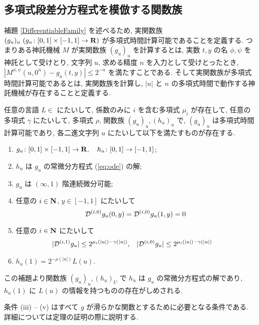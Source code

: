 \subsection{多項式段差分方程式を模倣する関数族}

 補題 \ref{DifferentiableFamily} を述べるため, 
 実関数族 $(g_u)_u \ (g_u \colon [0,1] \times [-1, 1] \to \mathbf R)$ 
 が多項式時間計算可能であることを定義する.
 つまりある神託機械 $M$ が実関数族 $(g_u)_u$ を計算するとは,
 実数 $t,y$ の名 $\phi, \psi$ を神託として受けとり,
 文字列 $u$, 求める精度 $n$ を入力として受けとったとき,
 $|M^{\phi, \psi}(u, 0^n) - g_u(t, y)| \le 2^{-n}$ を満たすことである.
 そして実関数族が多項式時間計算可能であるとは,
 実関数族を計算し, $|u|$ と $n$ の多項式時間で動作する神託機械が存在することと定義する.


\begin{lemma}
 \label{DifferentiableFamily}
 任意の言語 $L \in $ \PSPACE にたいして, 
 係数のみに $i$ を含む多項式 $\mu_i$ が存在して,
 任意の多項式 $\gamma$ にたいして,
 多項式 $\rho$, 関数族 $(g_u)_u, (h_u)_u$ で, 
 $(g_u)_u$ は多項式時間計算可能であり,
 各二進文字列 $u$ にたいして以下を満たすものが存在する.
 \begin{enumerate}
  \item $g_u\colon [0,1] \times [-1,1]\to \mathbf R, \quad h_u\colon [0,1] \to [-1,1]$;
  \item $h_u$ は $g_u$ の常微分方程式 (\ref{eq:ode}) の解; 
  \item $g_u$ は $(\infty, 1)$ 階連続微分可能;
  \item 任意の $i \in \mathbf N$, $y \in [-1,1]$ にたいして
	\begin{equation*}
	 \mathcal D^{(i, 0)} g_u(0,y) = \mathcal D^{(i, 0)} g_u(1,y) = 0 
	\end{equation*}
  \item 任意の $i \in \mathbf N$ にたいして
	\begin{align*}
	 |\mathcal D^{(i,1)} g_u| &\leq 2^{\mu_i (|u|) - \gamma(|u|)}, &
	 |\mathcal D^{(i,0)} g_u| &\leq 2^{\mu_i (|u|) - \gamma(|u|)}
	\end{align*} \label{enum:infty1}
  \item $h_u(1) = 2^{-\rho(|u|)}L(u)$.
 \end{enumerate}
\end{lemma}

 この補題より関数族 $(g_u)_u, (h_u)_U$ で $h_u$ は $g_u$ の常微分方程式の解であり,
 $h_u(1)$ に $L(u)$ の情報を持つものの存在がしめされる.

 条件 (iii) -- (v) はすべて $g$ が滑らかな関数とするために必要となる条件である.
 詳細については定理の証明の際に説明する.
 

